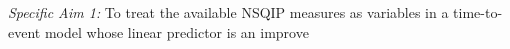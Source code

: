 \emph{Specific Aim 1:} To treat the available NSQIP measures as variables in a time-to-event model whose linear predictor is an improve